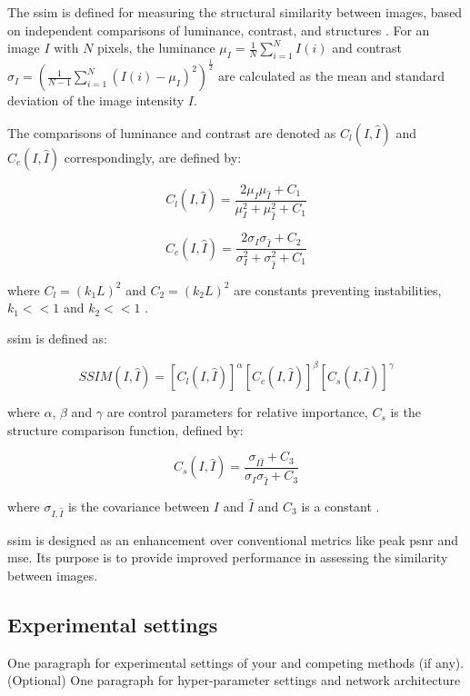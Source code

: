 \documentclass[conference]{IEEEtran}
\begin{document}
The \acrfull{ssim} is defined for measuring the structural similarity between images, based on independent comparisons of luminance, contrast, and structures \cite{ssim_2004}. For an image $I$ with $N$ pixels, the luminance $\mu_I = \frac{1}{N} \sum_{i=1}^{N} I(i)$ and contrast $\sigma_I = (\frac{1}{N-1} \sum_{i=1}^{N} (I(i) - \mu_I)^2)^{\frac{1}{2}}$ are calculated as the mean and standard deviation of the image intensity $I$.

The comparisons of luminance and contrast are denoted as $C_l(I, \hat{I})$ and $C_c(I, \hat{I})$ correspondingly, are defined by:

\begin{equation}  \label{eq:comp_luminosity}
    C_l(I, \hat{I}) = \frac{2 \mu_I \mu_{\hat{I}} + C_1 }{\mu_I^2 + \mu_{\hat{I}}^2 + C_1}
\end{equation}

\begin{equation}  \label{eq:comp_contrast}
    C_c(I, \hat{I}) = \frac{2 \sigma_I \sigma_{\hat{I}} + C_2 }{\sigma_I^2 + \sigma_{\hat{I}}^2 + C_1}
\end{equation}

where $C_l = (k_1 L)^2$ and $C_2 = (k_2 L)^2$ are constants preventing instabilities, $k_1 << 1$ and $k_2 << 1$ \cite{deep_learning_image_sr_2020}.

\Acrfull{ssim} is defined as:

\begin{equation}  \label{eq:ssim}
    SSIM(I,\hat{I}) = [C_l(I, \hat{I})]^{\alpha} [C_c(I, \hat{I})]^{\beta} [C_s(I, \hat{I})]^{\gamma}
\end{equation}

where $\alpha$, $\beta$ and $\gamma$ are control parameters for relative importance, $C_s$ is the structure comparison function, defined by:

\begin{equation}  \label{eq:structure_comp_f}
    C_s(I, \hat{I}) = \frac{\sigma_{I\hat{I}}+C_3}{\sigma_I \sigma_{\hat{I}}+C_3}
\end{equation}

where $\sigma_{I, \hat{I}}$ is the covariance between $I$ and $\hat{I}$ and $C_3$ is a constant \cite{deep_learning_image_sr_2020}.

\Acrfull{ssim} is designed as an enhancement over conventional metrics like peak \acrshort{psnr} and \acrshort{mse}. Its purpose is to provide improved performance in assessing the similarity between images.

\subsection{Experimental settings}
One paragraph for experimental settings of your and competing methods (if any).
(Optional) One paragraph for hyper-parameter settings and network architecture 
\end{document}
